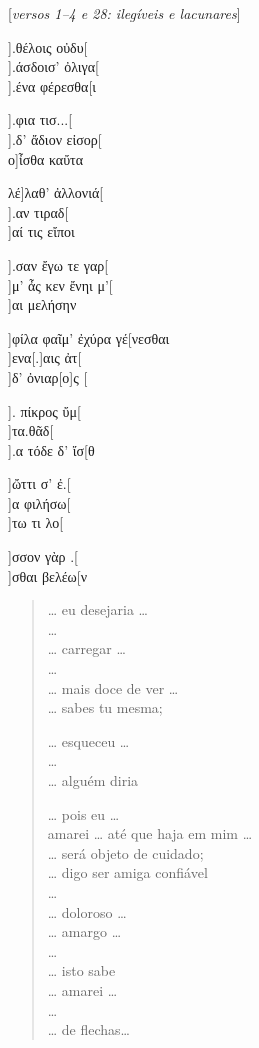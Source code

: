 \begin{gkverse}
\textnormal{[\emph{versos 1--4 e 28: ilegíveis e lacunares}]}

].θέλοις οὐδυ[\\
].άσδοισ’ ὀλιγα[\\
].ένα φέρεσθα[ι

  ].φια τισ...[\\
  ].δ’ ἄδιον εἰσορ[\\
ο]ἶσθα καὔτα

λέ]λαθ’ ἀλλονιά[\\
     ].αν τιραδ[\\
     ]αί τις εἴποι

].σαν ἔγω τε γαρ[\\
]μ’ ἆς κεν ἔνηι μ’[\\
  ]αι μελήσην

]φίλα φαῖμ’ ἐχύρα γέ[νεσθαι\\
   ]ενα[.]αις ἀτ[\\
          ]δ’ ὀνιαρ[ο]ς [

        ]. πίκρος ὔμ[\\
        ]τα.θᾶδ[\\
        ].α τόδε δ’ ἴσ[θ

       ]ὤττι σ’ ἐ.[\\
]α φιλήσω[\\
]τω τι λο[

]σσον γὰρ .[\\
          ]σθαι βελέω[ν
\end{gkverse}



\begin{verse}
\ldots{} eu desejaria \ldots{}\\
\ldots{}\\
\ldots{} carregar \ldots{}\\
\ldots{}\\
\ldots{} mais doce de ver \ldots{}\\
\ldots{} sabes tu mesma;\\

\medskip

\ldots{} esqueceu \ldots{}\\ 
\ldots{}\\
\ldots{} alguém diria\\

\medskip

\ldots{} pois eu \ldots{}\\
amarei \ldots{} até que haja em mim \ldots{}\\
\ldots{} será objeto de cuidado;\\
\ldots{} digo ser amiga confiável \\
\ldots{}\\
\ldots{} doloroso \ldots{}\\
\ldots{} amargo \ldots{}\\
\ldots{}\\
\ldots{} isto sabe\\
\ldots{} amarei \ldots{}\\
\ldots{}\\
\ldots{} de flechas\ldots{}
\end{verse}



